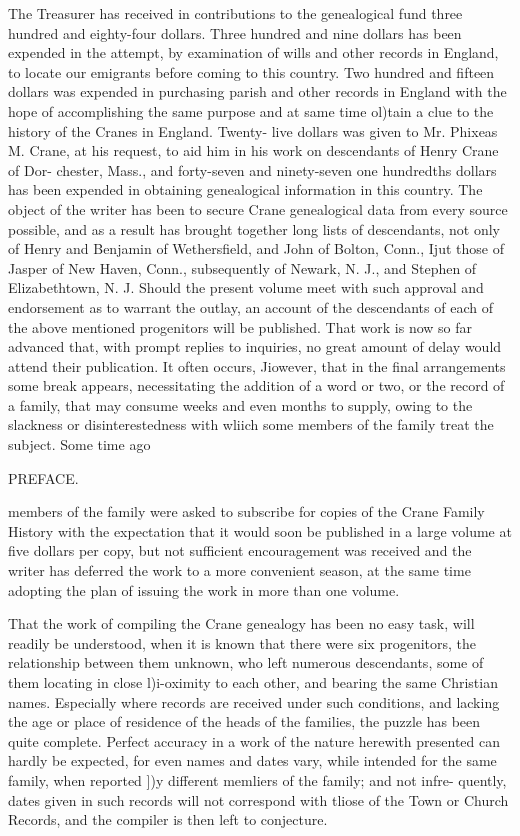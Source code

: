 The Treasurer has received in contributions to the genealogical 
fund three hundred and eighty-four dollars. Three hundred and 
nine dollars has been expended in the attempt, by examination of 
wills and other records in England, to locate our emigrants before 
coming to this country. Two hundred and fifteen dollars was 
expended in purchasing parish and other records in England with 
the hope of accomplishing the same purpose and at same time 
ol)tain a clue to the history of the Cranes in England. Twenty- 
live dollars was given to Mr. Phixeas M. Crane, at his request, 
to aid him in his work on descendants of Henry Crane of Dor- 
chester, Mass., and forty-seven and ninety-seven one hundredths 
dollars has been expended in obtaining genealogical information 
in this country. The object of the writer has been to secure 
Crane genealogical data from every source possible, and as a 
result has brought together long lists of descendants, not only of 
Henry and Benjamin of Wethersfield, and John of Bolton, 
Conn., Ijut those of Jasper of New Haven, Conn., subsequently 
of Newark, N. J., and Stephen of Elizabethtown, N. J. Should 
the present volume meet with such approval and endorsement as 
to warrant the outlay, an account of the descendants of each of 
the above mentioned progenitors will be published. That work 
is now so far advanced that, with prompt replies to inquiries, no 
great amount of delay would attend their publication. It often 
occurs, Jiowever, that in the final arrangements some break 
appears, necessitating the addition of a word or two, or the 
record of a family, that may consume weeks and even months to 
supply, owing to the slackness or disinterestedness with wliich 
some members of the family treat the subject. Some time ago 



PREFACE. 



members of the family were asked to subscribe for copies of the 
Crane Family History with the expectation that it would soon 
be published in a large volume at five dollars per copy, but not 
sufficient encouragement was received and the writer has deferred 
the work to a more convenient season, at the same time adopting 
the plan of issuing the work in more than one volume. 

That the work of compiling the Crane genealogy has been no 
easy task, will readily be understood, when it is known that there 
were six progenitors, the relationship between them unknown, 
who left numerous descendants, some of them locating in close 
l)i-oximity to each other, and bearing the same Christian names. 
Especially where records are received under such conditions, and 
lacking the age or place of residence of the heads of the families, 
the puzzle has been quite complete. Perfect accuracy in a work 
of the nature herewith presented can hardly be expected, for even 
names and dates vary, while intended for the same family, when 
reported ])y different memliers of the family; and not infre- 
quently, dates given in such records will not correspond with 
tliose of the Town or Church Records, and the compiler is then 
left to conjecture. 

